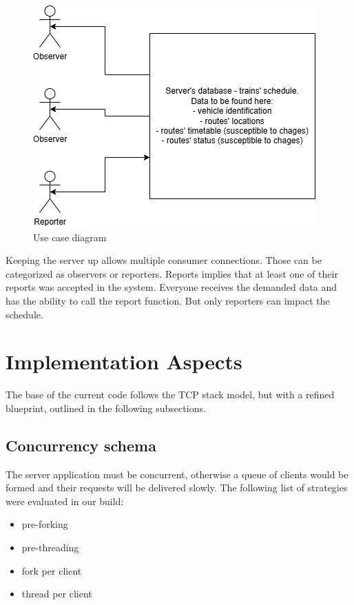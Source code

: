 \documentclass[runningheads]{llncs}
\begin{document}
\begin{figure}[!h]
    \includegraphics[width=\textwidth]{RR use case diagram.drawio.png}
    \caption{Use case diagram} \label{fig2}
\end{figure}

Keeping the server up allows multiple consumer connections. Those can be categorized as observers or reporters. Reports implies that at least one of their reports was accepted in the system. Everyone receives the demanded data and has the ability to call the report function. But only reporters can impact the schedule.


\section{Implementation Aspects}

The base of the current code follows the TCP stack model, but with a refined blueprint, outlined in the following subsections. 

\subsection{Concurrency schema}

The server application must be concurrent, otherwise a queue of clients would be formed and their requests will be delivered slowly. The following list of strategies were evaluated in our build:
\begin{itemize}
    \item pre-forking
    \item pre-threading
    \item fork per client
    \item thread per client
\end{itemize}
\end{document}
